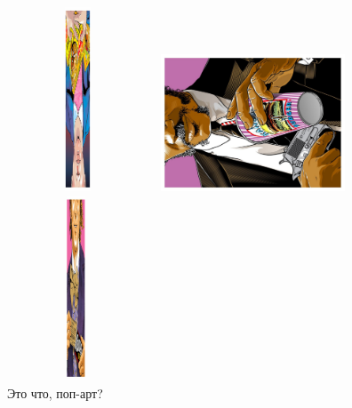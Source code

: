 \documentclass[12pt, a4paper]{article}
\begin{document}
\begin{figure}
\begin{minipage}[h!]{0.3\textwidth}
\includegraphics[height=5.49cm,width=4.2cm,angle=180]{pop2.pdf}
\end{minipage}
\begin{minipage}[h!]{0.3\textwidth}
\includegraphics[height=4.1cm,width=6cm,angle=270,keepaspectratio]{pop1.pdf}
\end{minipage}
\begin{minipage}[h!]{0.3\textwidth}
\includegraphics[height=5.5cm,width=4.1cm]{pop7.pdf}
\end{minipage}
\caption{Это что, поп-арт?}
\end{figure}
\end{document}
